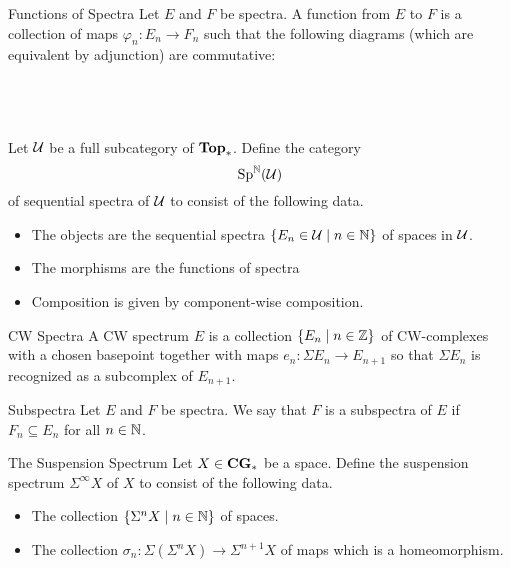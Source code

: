 \documentclass[a4paper]{article}
\begin{document}
\begin{defn}{Functions of Spectra}{} Let $E$ and $F$ be spectra. A function from $E$ to $F$ is a collection of maps $\varphi_n:E_n\to F_n$ such that the following diagrams (which are equivalent by adjunction) are commutative: \\~\\
\\~\\
\end{defn}

\begin{defn}{}{} Let $\mathcal{U}$ be a full subcategory of $\bold{Top}_\ast$. Define the category $$\text{Sp}^{\mathbb{N}}(\mathcal{U})$$ of sequential spectra of $\mathcal{U}$ to consist of the following data. 
\begin{itemize}
\item The objects are the sequential spectra $\{E_n\in\mathcal{U}\;|\;n\in\mathbb{N}\}$ of spaces in $\mathcal{U}$. 
\item The morphisms are the functions of spectra
\item Composition is given by component-wise composition. 
\end{itemize}
\end{defn}

\begin{defn}{CW Spectra}{} A CW spectrum $E$ is a collection $\{E_n\;|\;n\in\mathbb{Z}\}$ of CW-complexes with a chosen basepoint together with maps $e_n:\Sigma E_n\to E_{n+1}$ so that $\Sigma E_n$ is recognized as a subcomplex of $E_{n+1}$. 
\end{defn}

\begin{defn}{Subspectra}{} Let $E$ and $F$ be spectra. We say that $F$ is a subspectra of $E$ if $F_n\subseteq E_n$ for all $n\in\mathbb{N}$. 
\end{defn}

\begin{defn}{The Suspension Spectrum}{} Let $X\in\bold{CG}_\ast$ be a space. Define the suspension spectrum $\Sigma^\infty X$ of $X$ to consist of the following data. 
\begin{itemize}
\item The collection $\{\Sigma^n X\;|\;n\in\mathbb{N}\}$ of spaces. 
\item The collection $\sigma_n:\Sigma(\Sigma^nX)\to\Sigma^{n+1}X$ of maps which is a homeomorphism. 
\end{itemize}
\end{defn}
\end{document}
